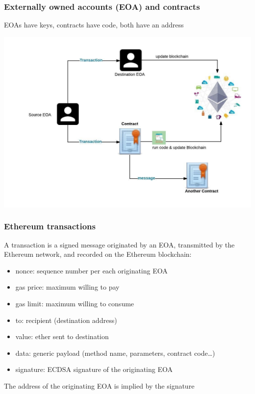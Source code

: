 \documentclass[11pt]{beamer}  %
\begin{document}
\begin{frame}\frametitle{Externally owned accounts (EOA) and contracts}

  \begin{greenbox}{}
    EOAs have keys, contracts have code, both have an address
  \end{greenbox}
  
  \begin{center}
    \includegraphics[scale=0.35,clip=false]{pictures/eoa-contract.jpg}
  \end{center}

\end{frame}

\begin{frame}\frametitle{Ethereum transactions}

  \begin{greenbox}{}
    A transaction is a signed message originated by an EOA, transmitted
    by the Ethereum network, and recorded on the Ethereum blockchain:
    \begin{itemize}
    \item nonce: sequence number per each originating EOA
    \item gas price: maximum willing to pay
    \item gas limit: maximum willing to consume
    \item to: recipient (destination address)
    \item value: ether sent to destination
    \item data: generic payload (method name, parameters, contract code\ldots)
    \item signature: ECDSA signature of the originating EOA
    \end{itemize}
  \end{greenbox}

  \begin{center}
    The address of the originating EOA is implied by the signature
  \end{center}

\end{frame}
\end{document}
